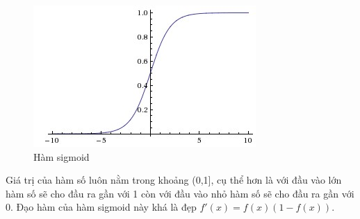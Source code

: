 \begin{enumerate}
\begin{center}
 	\begin{figure}[H]
    \begin{center}
    \includegraphics[scale=1]{chap3/image/sigmoid.jpeg}
    \end{center}
    \caption{Hàm sigmoid}
    \label{fig:sigmoid}
    \end{figure}
\end{center}

Giá trị của hàm số luôn nằm trong khoảng (0,1], cụ thể hơn là với đầu vào lớn hàm số sẽ cho đầu ra gần với 1 còn với đầu vào nhỏ hàm số sẽ cho đầu ra gần với 0. Đạo hàm của hàm sigmoid này khá là đẹp $f'(x) = f(x)(1-f(x))$.
	

\end{enumerate}
